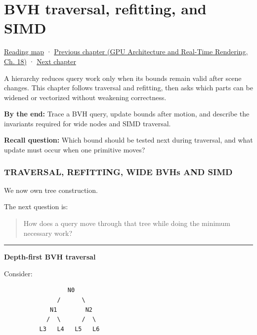 \chapter{BVH traversal, refitting, and SIMD}\label{06-engine-ii-ch028-bvh-traversal-refitting-and-simd}\hypertarget{06-engine-ii-ch028}{}\label{stagechapter:06-engine-ii-ch028}

\hyperref[volume-reading-map]{Reading map} · \href{../06-GPU-Architecture-and-Real-Time-Rendering/main.pdf\#nameddest=06-engine-ii-ch027-preparing-and-publishing-runtime-content}{Previous chapter (GPU Architecture and Real-Time Rendering, Ch. 18)} · \hyperref[06-engine-ii-ch029-dynamic-spatial-indices-for-moving-worlds]{Next chapter}

A hierarchy reduces query work only when its bounds remain valid after scene changes. This chapter follows traversal and refitting, then asks which parts can be widened or vectorized without weakening correctness.

\textbf{By the end:} Trace a BVH query, update bounds after motion, and describe the invariants required for wide nodes and SIMD traversal.

\textbf{Recall question:} Which bound should be tested next during traversal, and what update must occur when one primitive moves?

\subsection{TRAVERSAL, REFITTING, WIDE BVHs AND SIMD}\label{06-engine-ii-ch028-traversal-refitting-wide-bvhs-and-simd}

We now own tree construction.

The next question is:

\begin{quote}
How does a query move through that tree while doing the minimum necessary work?
\end{quote}

\begin{center}\rule{0.5\linewidth}{0.5pt}\end{center}

\textbf{Depth-first BVH traversal}

Consider:

\begin{verbatim}
                  N0
               /      \
             N1        N2
            /  \      /  \
          L3   L4   L5   L6
\end{verbatim}

